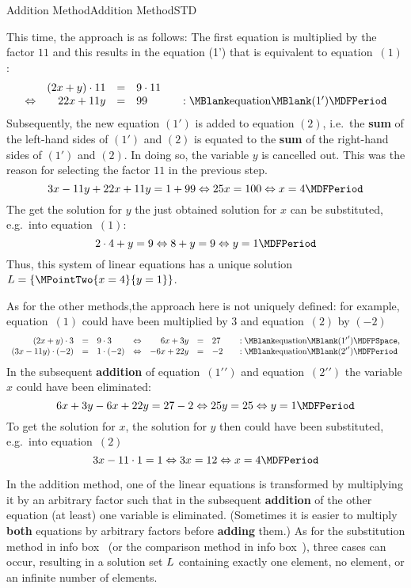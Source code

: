 \begin{MXContent}{Addition Method}{Addition Method}{STD}
\begin{MExample}
This time, the approach is as follows: The first equation is multiplied by the factor $11$ and this 
results in the equation (1') that is equivalent to equation~$(1)$: 
$$\begin{array}{crclcl} & (2 x + y) \cdot 11 & = & 9 \cdot 11 & & \\
\Leftrightarrow & 22 x + 11 y & = & 99 & & : \MBlank\mbox{equation}\MBlank (1') 
\MDFPeriod \end{array}$$
Subsequently, the new equation $(1')$ is added to equation $(2)$, i.e.\ the \textbf{sum}
of the left-hand sides of $(1')$ and $(2)$ is equated to the \textbf{sum} of
the right-hand sides of $(1')$ and $(2)$. In doing so, the variable $y$ is cancelled
out. This was the reason for selecting the factor $11$ in the previous step. 
$$3 x - 11 y + 22 x + 11 y = 1 + 99 \Leftrightarrow 25 x = 100 \Leftrightarrow x = 4 \MDFPeriod $$
The get the solution for $y$ the just obtained solution for $x$ can be substituted, e.g.\
into equation~$(1)$:
$$2 \cdot 4 + y = 9 \Leftrightarrow 8 + y = 9 \Leftrightarrow y = 1 \MDFPeriod$$
Thus, this system of linear equations has a unique solution ${\ML} =
\{ \MPointTwo{x = 4}{y = 1} \}$.
\end{MExample}
As for the other methods,the approach here is not uniquely defined: 
for example, equation~$(1)$ could have been multiplied by $3$ and equation~$(2)$ by $(- 2)$
$$\begin{array}{rclcrclcl} (2x + y) \cdot 3 & = & 9 \cdot 3 & \Leftrightarrow & 6 x + 3 y & = & 27
& & : \MBlank\mbox{equation}\MBlank ({1'}') \MDFPSpace, \\ 
(3 x - 11 y) \cdot (- 2) & = & 1 \cdot (- 2) & \Leftrightarrow & - 6 x + 22 y & = & - 2
& & : \MBlank\mbox{equation}\MBlank ({2'}') \MDFPeriod\end{array}$$
In the subsequent \textbf{addition} of equation~$({1'}')$ and equation~$({2'}')$ the variable $x$ could have been
eliminated:
$$6 x + 3 y - 6 x + 22 y = 27 - 2 \Leftrightarrow 25 y = 25 \Leftrightarrow y = 1 \MDFPeriod$$
To get the solution for $x$, the solution for $y$ then could have been substituted, e.g.\ 
into equation~$(2)$
$$3 x - 11 \cdot 1 = 1 \Leftrightarrow 3 x = 12 \Leftrightarrow x = 4 \MDFPeriod$$
\begin{MInfo}
In the addition method, one of the linear equations is transformed by multiplying it by 
an arbitrary factor such that in the subsequent \textbf{addition} of the other equation
(at least) one variable is eliminated. (Sometimes it is easier to multiply 
\textbf{both} equations by arbitrary factors before \textbf{adding} them.)
As for the substitution method in info box~\MRef{M04_einsetzmethode} 
(or the comparison method in info box~\MRef{M04_gleichsetzmethode}), three cases can occur, 
resulting in a solution set $L$ containing exactly one element, no element, or an infinite number of
elements.
\end{MInfo}
\end{MXContent}

